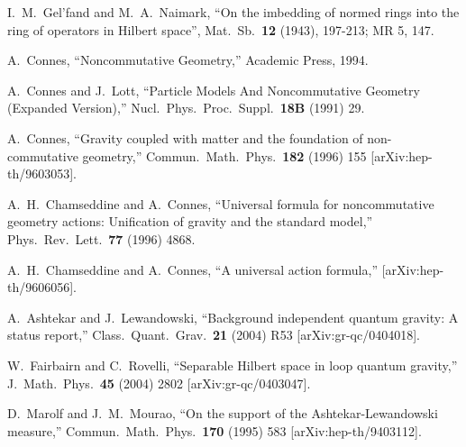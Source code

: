 \documentclass[12pt]{article}
\begin{document}
\begin{thebibliography}{99}

I.~M.~Gel'fand and M.~A.~Naimark,
``On the imbedding of normed rings into the ring of operators in Hilbert
space'', Mat.\ Sb.\ {\bf 12} (1943), 197-213; MR 5, 147.



A.~Connes,
``Noncommutative Geometry,'' Academic Press, 1994.




A.~Connes and J.~Lott,
``Particle Models And Noncommutative Geometry (Expanded Version),''
Nucl.\ Phys.\ Proc.\ Suppl.\  {\bf 18B} (1991) 29.



A.~Connes,
``Gravity coupled with matter and the foundation of non-commutative
geometry,''
Commun.\ Math.\ Phys.\  {\bf 182} (1996) 155
[arXiv:hep-th/9603053].

A.~H.~Chamseddine and A.~Connes,
``Universal formula for noncommutative geometry actions: Unification of
gravity and the standard model,''
Phys.\ Rev.\ Lett.\  {\bf 77} (1996) 4868.

 


 
A.~H.~Chamseddine and A.~Connes,
``A universal action formula,''
[arXiv:hep-th/9606056].







A.~Ashtekar and J.~Lewandowski,
``Background independent quantum gravity: A status report,''
Class.\ Quant.\ Grav.\  {\bf 21} (2004) R53
[arXiv:gr-qc/0404018].


  W.~Fairbairn and C.~Rovelli,
  ``Separable Hilbert space in loop quantum gravity,''
  J.\ Math.\ Phys.\  {\bf 45} (2004) 2802
  [arXiv:gr-qc/0403047].




D.~Marolf and J.~M.~Mourao,
``On the support of the Ashtekar-Lewandowski measure,''
Commun.\ Math.\ Phys.\  {\bf 170} (1995) 583
[arXiv:hep-th/9403112].





\end{thebibliography}
\end{document}
